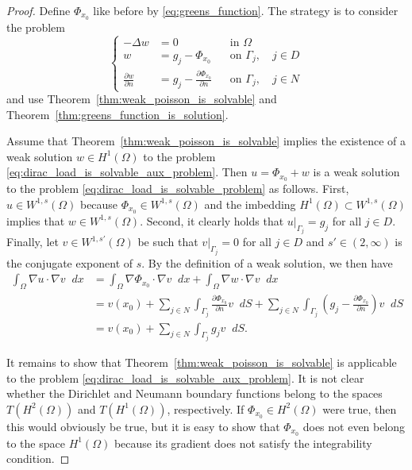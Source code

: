 \documentclass[english, 12pt, a4paper, sci, utf8, a-2b, online]{aaltothesis}
\theoremstyle{definition}
\theoremstyle{plain}
\newcommand*\diff{\mathop{}\!d}
\numberwithin{equation}{section}
\begin{document}
\begin{proof}
    Define $\Phi_{x_0}$ like before by \eqref{eq:greens_function}.
    The strategy is to consider the problem
    \begin{equation}
        \label{eq:dirac_load_is_solvable_aux_problem}
        \left\{
            \begin{aligned}
                -\Delta w &= 0 && \text{in } \Omega \\
                w &= g_j - \Phi_{x_0} && \text{on } \Gamma_j, \quad j \in D \\
                \frac{\partial w}{\partial n} &=
                    g_j - \frac{\partial \Phi_{x_0}}{\partial n}
                        && \text{on } \Gamma_j, \quad j \in N
            \end{aligned}
        \right.
    \end{equation}
    and use Theorem~\ref{thm:weak_poisson_is_solvable} and
    Theorem~\ref{thm:greens_function_is_solution}.
    
    Assume that Theorem~\ref{thm:weak_poisson_is_solvable} implies the
    existence of a weak solution $w \in H^1(\Omega)$ to the problem
    \eqref{eq:dirac_load_is_solvable_aux_problem}.
    Then $u = \Phi_{x_0} + w$ is a weak solution to the problem
    \eqref{eq:dirac_load_is_solvable_problem} as follows.
    First, $u \in W^{1,s}(\Omega)$ because $\Phi_{x_0} \in W^{1,s}(\Omega)$
    and the imbedding $H^1(\Omega) \subset W^{1,s}(\Omega)$ implies that $w \in W^{1,s}(\Omega)$.
    Second, it clearly holds that $u|_{\Gamma_j} = g_j$ for all $j \in D$.
    Finally, let $v \in W^{1,s'}(\Omega)$ be such that $v|_{\Gamma_j} = 0$
    for all $j \in D$ and $s' \in (2, \infty)$ is the conjugate exponent of $s$.
    By the definition of a weak solution, we then have
    \begin{align*}
        \int_{\Omega} \nabla u \cdot \nabla v \diff x
        &= \int_{\Omega} \nabla \Phi_{x_0} \cdot \nabla v \diff x 
            + \int_{\Omega} \nabla w \cdot \nabla v \diff x \\
        &= v(x_0)
            + \sum_{j \in N} \int_{\Gamma_j}
                \frac{\partial \Phi_{x_0}}{\partial n} v \diff S
            + \sum_{j \in N} \int_{\Gamma_j}
                \left( g_j - \frac{\partial \Phi_{x_0}}{\partial n} \right) v \diff S \\
        &= v(x_0) + \sum_{j \in N} \int_{\Gamma_j} g_j v \diff S.
    \end{align*}

    It remains to show that Theorem~\ref{thm:weak_poisson_is_solvable}
    is applicable to the problem \eqref{eq:dirac_load_is_solvable_aux_problem}.
    It is not clear whether the Dirichlet and Neumann boundary functions
    belong to the spaces $T(H^2(\Omega))$ and $T(H^1(\Omega))$, respectively.
    If $\Phi_{x_0} \in H^2(\Omega)$ were true, then this would obviously be true,
    but it is easy to show that $\Phi_{x_0}$ does not even belong to the space $H^1(\Omega)$
    because its gradient does not satisfy the integrability condition.
    

\end{proof}
\end{document}
